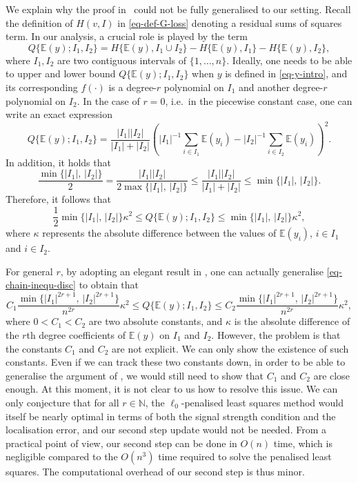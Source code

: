 \documentclass{article}
\begin{document}
We explain why the proof in~\cite{wang2020univariate} could not be fully generalised to our setting.  Recall the definition of $H(v, I)$ in \eqref{eq-def-G-loss} denoting a residual sums of squares term.  In our analysis, a crucial role is played by the term
	\[
		Q\{\mathbb{E}(y); I_1, I_2\} = H\{\mathbb{E}(y), I_1 \cup I_2\} - H\{\mathbb{E}(y), I_1\} - H\{\mathbb{E}(y), I_2\},
	\]
	where $I_1, I_2$ are two contiguous intervals of $\{1, \ldots, n\}$.   Ideally, one needs to be able to upper and lower bound $Q\{\mathbb{E}(y); I_1, I_2\}$ when $y$ is defined in \eqref{eq-y-intro}, and its corresponding $f(\cdot)$ is a degree-$r$ polynomial on $I_1$ and another degree-$r$ polynomial on $I_2$.   In the case of $r = 0$, i.e.~in the piecewise constant case, one can write an exact expression 
	\[
		Q\{\mathbb{E}(y); I_1, I_2\} = \frac{|I_1||I_2|}{|I_1| + |I_2|} \left(|I_1|^{-1}\sum_{i \in I_1} \mathbb{E}(y_i) - |I_2|^{-1}\sum_{i \in I_2} \mathbb{E}(y_i)\right)^2.
	\]
	In addition, it holds that
	\[
		\frac{\min\{|I_1|, \, |I_2|\}}{2} = \frac{|I_1||I_2|}{2 \max\{|I_1|, \, |I_2|\}} \leq \frac{|I_1||I_2|}{|I_1| + |I_2|} \leq \min\{|I_1|, \, |I_2|\}.
	\]
	Therefore, it follows that 
	\begin{equation}\label{eq-chain-inequ-disc}
		\frac{1}{2} \min\{|I_1|, \, |I_2|\} \kappa^2 \leq Q\{\mathbb{E}(y); I_1, I_2\} \leq \min\{|I_1|, \, |I_2|\} \kappa^2,
	\end{equation}
	where $\kappa$ represents the absolute difference between the values of $\mathbb{E}(y_i)$, $i \in I_1$ and $i \in I_2$.

For general $r$, by adopting an elegant result in \cite{shen2020phase}, one can actually generalise \eqref{eq-chain-inequ-disc} to obtain that
	\begin{equation}\label{eq-Q-lack-upper}
		C_1 \frac{\min\{|I_1|^{2r + 1}, \, |I_2|^{2r + 1}\}}{n^{2r}}\kappa^2 \leq Q\{\mathbb{E}(y); I_1, I_2\} \leq C_2 \frac{\min\{|I_1|^{2r+1}, \, |I_2|^{2r+1}\}}{n^{2r}} \kappa^2,
	\end{equation}
	where $0 < C_1 < C_2$ are two absolute constants, and $\kappa$ is the absolute difference of the $r$th degree coefficients of $\mathbb{E}(y)$ on $I_1$ and $I_2$.  However, the problem is that the constants $C_1$ and $C_2$ are not explicit.  We can only show the existence of such constants.  Even if we can track these two constants down, in order to be able to generalise the argument of \cite{wang2020univariate}, we would still need to show that $C_1$ and $C_2$ are close enough.  At this moment, it is not clear to us how to resolve this issue.  We can only conjecture that for all $r \in \mathbb{N}$, the $\ell_0$-penalised least squares method would itself be nearly optimal in terms of both the signal strength condition and the localisation error, and our second step update would not be needed. From a practical point of view, our second step can be done in $O(n)$ time, which is negligible compared to the $O(n^3)$ time required to solve the penalised least squares.  The computational overhead of our second step is thus minor. 
\end{document}
